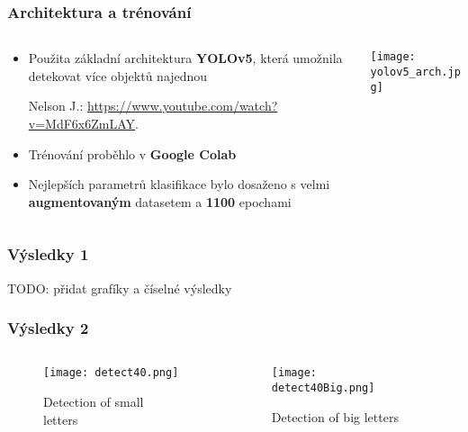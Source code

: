 \begin{frame}
   \frametitle{Architektura a trénování}
   \begin{columns}[t, onlytextwidth]
      \begin{column}[T]{0.44\textwidth}
         \begin{itemize}
            \item Použita základní architektura \textbf{YOLOv5}, která umožnila detekovat více objektů najednou
            \parbox{\textwidth}{\tiny {\color{ctu4blue}Nelson J.}: \url{https://www.youtube.com/watch?v=MdF6x6ZmLAY}.}
            \item Trénování proběhlo v \textbf{Google Colab}
            \item Nejlepších parametrů klasifikace bylo dosaženo s velmi \textbf{augmentovaným} datasetem a \textbf{1100} epochami
         \end{itemize}
      \end{column}
      \begin{column}[T]{0.55\textwidth}
         \centering
         \texttt{[image: yolov5\_arch.jpg]}
      \end{column}
   \end{columns}
\end{frame}

\begin{frame}
   \frametitle{Výsledky 1}
   
	TODO: přidat grafíky a číselné výsledky
\end{frame}

\begin{frame}
   \frametitle{Výsledky 2}
   \begin{columns}[t, onlytextwidth]
      \begin{column}[T]{0.5\textwidth}
         \begin{figure}[h]
         		\centering
         		\texttt{[image: detect40.png]}
			\caption{Detection of small letters}
		\end{figure}
      \end{column}
      \begin{column}[T]{0.50\textwidth}
		\begin{figure}[h]
         		\centering
         		\texttt{[image: detect40Big.png]}
			\caption{Detection of big letters}
		\end{figure}
      \end{column}
   \end{columns}
\end{frame}

